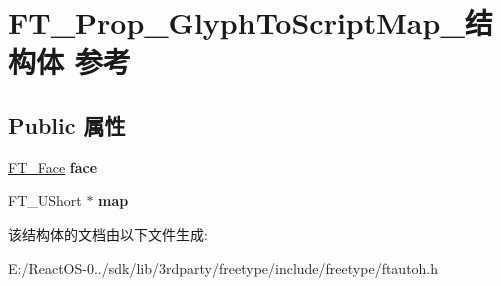 \hypertarget{struct_f_t___prop___glyph_to_script_map__}{}\section{F\+T\+\_\+\+Prop\+\_\+\+Glyph\+To\+Script\+Map\+\_\+结构体 参考}
\label{struct_f_t___prop___glyph_to_script_map__}
\subsection*{Public 属性}
\begin{DoxyCompactItemize}
\item 
\mbox{\label{struct_f_t___prop___glyph_to_script_map___a08fa6630173f5351bf5bf8e54ab0adcf}} 
\hyperlink{struct_f_t___face_rec__}{F\+T\+\_\+\+Face} {\bfseries face}
\item 
\mbox{\label{struct_f_t___prop___glyph_to_script_map___ab7e1c8285f5263a6c4b03ac8d2fb029d}} 
F\+T\+\_\+\+U\+Short $\ast$ {\bfseries map}
\end{DoxyCompactItemize}


该结构体的文档由以下文件生成\+:\begin{DoxyCompactItemize}
\item 
E\+:/\+React\+O\+S-\/0../sdk/lib/3rdparty/freetype/include/freetype/ftautoh.\+h\end{DoxyCompactItemize}
